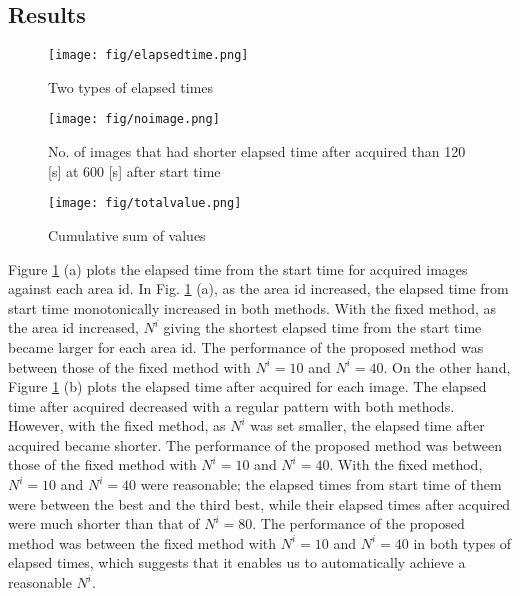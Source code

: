 \documentclass{ieeeaccess}
\begin{document}
\subsection{Results}

\begin{figure}[t]
\begin{center}
\texttt{[image: fig/elapsedtime.png]}
\caption{Two types of elapsed times}
\label{elapsed}
\end{center}
\end{figure}

\begin{figure*}[t]
\begin{center}
\texttt{[image: fig/noimage.png]}
\caption{No. of images that had shorter elapsed time after acquired than 120 [s] at 600 [s] after start time}
\label{totalnumber}
\end{center}
\end{figure*}

\begin{figure*}[t]
\begin{center}
\texttt{[image: fig/totalvalue.png]}
\caption{Cumulative sum of values}
\label{totalvalue}
\end{center}
\end{figure*}

Figure \ref{elapsed} (a) plots the elapsed time from the start time for acquired images against each area id. 
In Fig. \ref{elapsed} (a), as the area id increased, the elapsed time from start time monotonically increased in both methods. With the fixed method, as the area id increased, $N^i$ giving the shortest elapsed time from the start time became larger for each area id. 
The performance of the proposed method was between those of the fixed method with $N^i=10$ and $N^i=40$. 
On the other hand, Figure \ref{elapsed} (b) plots the elapsed time after acquired for each image. 
The elapsed time after acquired decreased with a regular pattern with both methods. However, with the fixed method, as $N^i$ was set smaller, the elapsed time after acquired became shorter. The performance of the proposed method was between those of the fixed method with $N^i=10$ and $N^i=40$. With the fixed method, $N^i=10$ and $N^i=40$ were reasonable; the elapsed times from start time of them were between the best and the third best, while their elapsed times after acquired were much shorter than that of $N^i=80$. The performance of the proposed method was between the fixed method with $N^i=10$ and $N^i=40$ in both types of elapsed times, which suggests that it enables us to automatically achieve a reasonable $N^i$.
\end{document}
